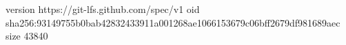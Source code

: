 version https://git-lfs.github.com/spec/v1
oid sha256:93149755b0bab42832433911a001268ae1066153679c06bff2679df981689aec
size 43840
